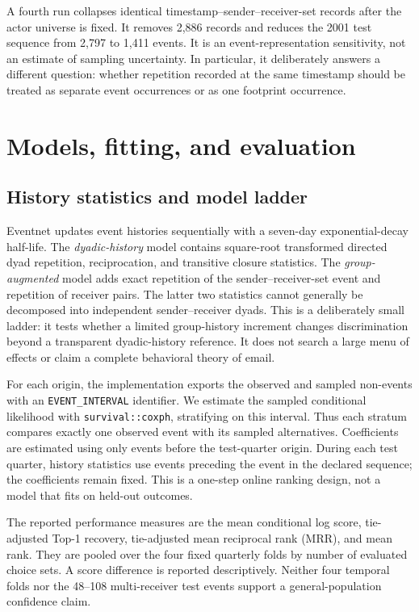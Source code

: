 \documentclass[11pt]{article}
\begin{document}
A fourth run collapses identical timestamp--sender--receiver-set records after the actor universe is fixed. It removes 2,886 records and reduces the 2001 test sequence from 2,797 to 1,411 events. It is an event-representation sensitivity, not an estimate of sampling uncertainty. In particular, it deliberately answers a different question: whether repetition recorded at the same timestamp should be treated as separate event occurrences or as one footprint occurrence.

\section{Models, fitting, and evaluation}\label{sec:methods}

\subsection{History statistics and model ladder}

Eventnet updates event histories sequentially with a seven-day exponential-decay half-life. The \emph{dyadic-history} model contains square-root transformed directed dyad repetition, reciprocation, and transitive closure statistics. The \emph{group-augmented} model adds exact repetition of the sender--receiver-set event and repetition of receiver pairs. The latter two statistics cannot generally be decomposed into independent sender--receiver dyads. This is a deliberately small ladder: it tests whether a limited group-history increment changes discrimination beyond a transparent dyadic-history reference. It does not search a large menu of effects or claim a complete behavioral theory of email.

For each origin, the implementation exports the observed and sampled non-events with an \texttt{EVENT\_INTERVAL} identifier. We estimate the sampled conditional likelihood with \texttt{survival::coxph}, stratifying on this interval. Thus each stratum compares exactly one observed event with its sampled alternatives. Coefficients are estimated using only events before the test-quarter origin. During each test quarter, history statistics use events preceding the event in the declared sequence; the coefficients remain fixed. This is a one-step online ranking design, not a model that fits on held-out outcomes.

The reported performance measures are the mean conditional log score, tie-adjusted Top-1 recovery, tie-adjusted mean reciprocal rank (MRR), and mean rank. They are pooled over the four fixed quarterly folds by number of evaluated choice sets. A score difference is reported descriptively. Neither four temporal folds nor the 48--108 multi-receiver test events support a general-population confidence claim.
\end{document}
